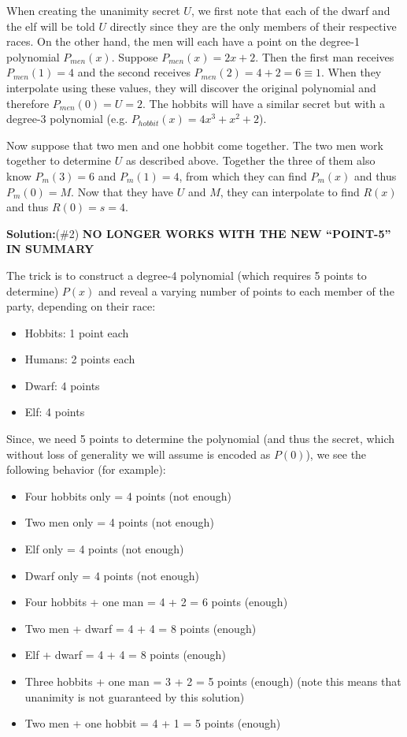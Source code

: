 \documentclass[]{article}
\renewcommand{\answer}[1]{{\color{mydarkblue}\textbf{Solution:}#1}}
\begin{document}
\begin{qunlist}
{{When creating the unanimity secret $U$, we first note that each of the dwarf and the elf will be told $U$ directly since they are the only members of their respective races. On the other hand, the men will each have a point on the degree-1 polynomial $P_{men}(x)$. Suppose $P_{men}(x) = 2x+2$. Then the first man receives $P_{men}(1) = 4$ and the second receives $P_{men}(2) = 4+2 = 6 \equiv 1$. When they interpolate using these values, they will discover the original polynomial and therefore $P_{men}(0) = U = 2$. The hobbits will have a similar secret but with a degree-3 polynomial (e.g. $P_{hobbit}(x) = 4x^3 + x^2 + 2$).

Now suppose that two men and one hobbit come together. The two men work together to determine $U$ as described above. Together the three of them also know $P_m(3)=6$ and $P_m(1)=4$, from which they can find $P_m(x)$ and thus $P_m(0) = M$. Now that they have $U$ and $M$, they can interpolate to find $R(x)$ and thus $R(0) = s = 4$.




\answer (\#2) \textbf{NO LONGER WORKS WITH THE NEW ``POINT-5'' IN SUMMARY}

The trick is to construct a degree-4 polynomial (which requires 5 points to determine) $P(x)$ and reveal a varying number of points to each member of the party, depending on their race:

\begin{itemize}
	\item Hobbits: 1 point each
	\item Humans: 2 points each
	\item Dwarf: 4 points
	\item Elf: 4 points
\end{itemize}

Since, we need 5 points to determine the polynomial (and thus the secret, which without loss of generality we will assume is encoded as $P(0)$), we see the following behavior (for example):
\begin{itemize}
	\item Four hobbits only = 4 points (not enough)
	\item Two men only = 4 points (not enough)
	\item Elf only = 4 points (not enough)
	\item Dwarf only = 4 points (not enough)
	\item Four hobbits + one man = 4 + 2 = 6 points (enough)
	\item Two men + dwarf = 4 + 4 = 8 points (enough)
	\item Elf + dwarf = 4 + 4 = 8 points (enough)
	\item Three hobbits + one man = 3 + 2 = 5 points (enough) (note this means that unanimity is not guaranteed by this solution)
	\item Two men + one hobbit = 4 + 1 = 5 points (enough)
\end{itemize}

}}
\end{qunlist}
\end{document}
